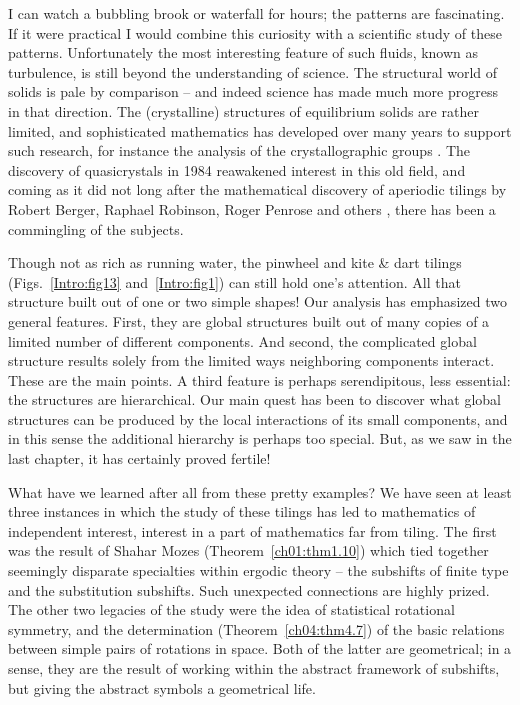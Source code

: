 \documentclass[reqno]{stml-l}
\theoremstyle{plain}
\theoremstyle{definition}
\numberwithin{equation}{chapter}
\begin{document}
I can watch a bubbling brook or waterfall for hours; the patterns are fascinating. If it were practical I would combine this curiosity with a scientific study of these patterns. Unfortunately the most interesting feature of such fluids, known as turbulence, is still beyond the understanding of science. The structural world of solids is pale by comparison -- and indeed science has made much more progress in that direction. The (crystalline) structures of equilibrium solids are rather limited, and sophisticated mathematics has developed over many years to support such research, for instance the analysis of the crystallographic groups \cite[p. 70]{bib:HiC}. The discovery of quasicrystals in 1984 \cite{bib:StO} reawakened interest in this old field, and coming as it did not long after the mathematical discovery of aperiodic tilings by Robert Berger, Raphael Robinson, Roger Penrose and others \cite{bib:GrS}, there has been a commingling of the subjects.

Though not as rich as running water, the pinwheel and kite \& dart tilings (Figs.~\ref{Intro:fig13} and~\ref{Intro:fig1}) can still hold one's attention. All that structure built out of one or two simple shapes! Our analysis has emphasized two general features. First, they are global structures built out of many copies of a limited number of different components. And second, the complicated global structure results solely from the
limited ways neighboring components interact. These are the main points. A third feature is perhaps serendipitous, less essential: the structures are hierarchical. Our main quest has been to discover what global structures can be produced by the local interactions of its small components, and in this sense the additional hierarchy is perhaps too special. But, as we saw in the last chapter, it has certainly proved fertile!

What have we learned after all from these pretty examples? We have seen at least three instances in which the study of these tilings has led to mathematics of independent interest, interest in a part of mathematics far from tiling. The first was the result of Shahar Mozes (Theorem~\ref{ch01:thm1.10}) which tied together seemingly disparate specialties within ergodic theory -- the subshifts of finite type and the substitution subshifts. Such unexpected connections are highly prized. The other two legacies of the study were the idea of statistical rotational symmetry, and the determination (Theorem~\ref{ch04:thm4.7}) of the basic relations between simple pairs of rotations in space. Both of the latter are geometrical; in a sense, they are the result of working within the abstract framework of subshifts, but giving the abstract symbols a geometrical life.
\end{document}
